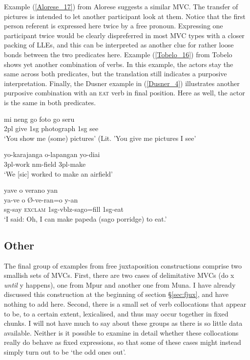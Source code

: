Example (\ref{Alorese_17}) from Alorese suggests a similar MVC. The transfer of pictures is intended to let another participant look at them. Notice that the first person referent is expressed here twice by a free pronoun. Expressing one participant twice would be clearly dispreferred in most MVC types with a closer packing of LLEs, and this can be interpreted as another clue for rather loose bonds between the two predicates here. Example (\ref{Tobelo_16}) from Tobelo shows yet another combination of verbs. In this example, the actors stay the same across both predicates, but the translation still indicates a purposive interpretation. Finally, the Dusner example in (\ref{Dusner_4}) illustrates another purposive combination with an \textsc{eat} verb in final position. Here as well, the actor is the same in both predicates.

\ea \label{Alorese_17}
\gll mi neng go foto go seru \\
2\acs{pl} give 1\acs{sg} photograph 1\acs{sg} see \\
\glft `You show me (some) pictures' (Lit. 'You give me pictures I see' \\ 
\z
\xe

\ea \label{Tobelo_16}
\gll yo-karajanga o-lapangan yo-diai \\
3\acs{pl}-work \acs{nm}-field 3\acs{pl}-make \\
\glft `We [sic] worked to make an airfield' \\ 
\z
\xe

\ea \label{Dusner_4}
\gll yave o verano yan \\
ya-ve o Ø-ve-ran=o y-an \\
\acs{sg}-say \textsc{exclam} 1\acs{sg}-\acs{vblz}-sago=\acs{fill} 1\acs{sg}-eat \\
\glft `I said: Oh, I can make papeda (sago porridge) to eat.' \\ 
\z
\xe

\subsection{Other}

The final group of examples from free juxtaposition constructions comprise two smallish sets of MVCs. First, there are two cases of delimitative MVCs (do x \textit{until} y happens), one from Mpur and another one from Muna. I have already discussed this construction at the beginning of section §\ref{sec:fjux}, and have nothing to add here. Second, there is a small set of verb collocations that appear to be, to a certain extent, lexicalised, and thus may occur together in fixed chunks. I will not have much to say about these groups as there is so little data available. Neither is it possible to examine in detail whether these collocations really do behave as fixed expressions, so that some of these cases might instead simply turn out to be `the odd ones out'.

